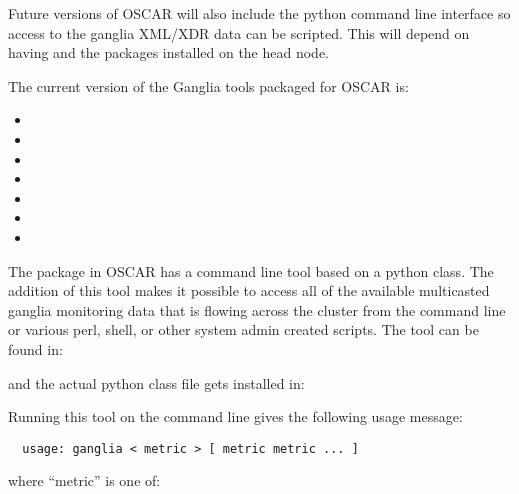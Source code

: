 Future versions of OSCAR will also include the  python
command line interface so access to the ganglia XML/XDR data can be
scripted. This will depend on having  and the
 packages installed on the head node.

The current version of the Ganglia tools packaged for OSCAR is:

\begin{itemize}
\item {}
\item {}
\item {}
\item {}
\item {}
\item {}
\item {}
\end{itemize}

The  package in OSCAR \oscarversion has a command line
tool based on a python class. The addition of this tool makes it
possible to access all of the available multicasted ganglia monitoring
data that is flowing across the cluster from the command line or
various perl, shell, or other system admin created scripts.  The tool
can be found in:

\vspace{10pt}
\centerline{}
\vspace{10pt}

\noindent and the actual python class file gets installed in:

\vspace{10pt}
\centerline{}
\vspace{10pt}

Running this tool on the command line gives the following usage
message:

\begin{verbatim}
  usage: ganglia < metric > [ metric metric ... ]
\end{verbatim}

where ``metric'' is one of:

